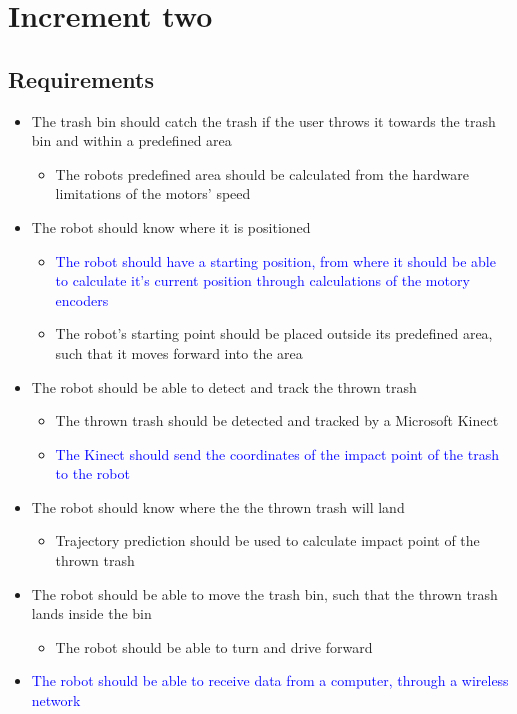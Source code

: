 \chapter{Increment two}
\label{chap:Increment two}

\section{Requirements}
\label{sec:i2Requirements}

\begin{itemize}
	\item The trash bin should catch the trash if the user throws it towards the trash bin and within a predefined area
	\begin{itemize}
		\item {The robots predefined area should be calculated from the hardware limitations of the motors’ speed}
	\end{itemize}
	\item The robot should know where it is positioned
	\begin{itemize}
		\item \textcolor{blue}{The robot should have a starting position, from where it should be able to calculate it's current position through calculations of the motory encoders}
		\item {The robot's starting point should be placed outside its predefined area, such that it moves forward into the area}
	\end{itemize}
	\item The robot should be able to detect and track the thrown trash
	\begin{itemize}
		\item {The thrown trash should be detected and tracked by a Microsoft Kinect}
		\item \textcolor{blue}{The Kinect should send the coordinates of the impact point of the trash to the robot}
	\end{itemize}
	\item The robot should know where the the thrown trash will land
	\begin{itemize}
		\item {Trajectory prediction should be used to calculate impact point of the thrown trash}
	\end{itemize}
	\item The robot should be able to move the trash bin, such that the thrown trash lands inside the bin
	\begin{itemize}
		\item {The robot should be able to turn and drive forward}
	\end{itemize}
	\item \textcolor{blue}{The robot should be able to receive data from a computer, through a wireless network}
\end{itemize}

